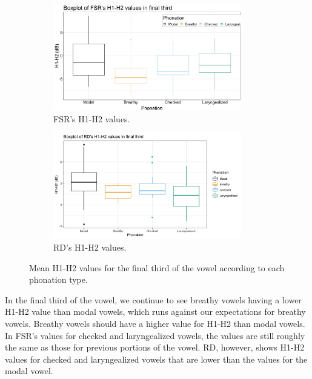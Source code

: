\documentclass[12pt, letterpaper]{article}
\begin{document}
\begin{figure}[!ht]
	\centering
	\begin{subfigure}{.5\textwidth}
		\centering
		\includegraphics[width=0.9\textwidth]{Images/mean_FSR_h1h2_3rd.png}
		\caption{FSR's H1-H2 values.}
		\label{fig:FSRh1h2third} 
	\end{subfigure}%
	\begin{subfigure}{.5\textwidth}
		\centering
		\includegraphics[width=0.9\textwidth]{Images/mean_RD_h1h2_3rd.png}
		\caption{RD's H1-H2 values.}
		\label{fig:RDh1h2third} 
	\end{subfigure}
	\caption{Mean H1-H2 values for the final third of the vowel according to each phonation type. }
	\label{fig:h1h2third}
\end{figure}

In the final third of the vowel, we continue to see breathy vowels having a lower H1-H2 value than modal vowels, which runs against our expectations for breathy vowels. Breathy vowels should have a higher value for H1-H2 than modal vowels. In FSR's values for checked and laryngealized vowels, the values are still roughly the same as those for previous portions of the vowel. RD, however, shows H1-H2 values for checked and laryngealized vowels that are lower than the values for the modal vowel. 
\end{document}
